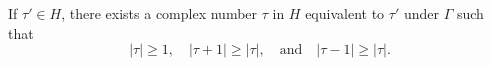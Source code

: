 If $\tau' \in H$, there exists a complex number $\tau$ in $H$ equivalent to $\tau'$ under $\Gamma$ such that
$$|\tau| \geq 1, \quad |\tau + 1| \geq |\tau|, \quad \text{and} \quad |\tau - 1| \geq |\tau|.$$
